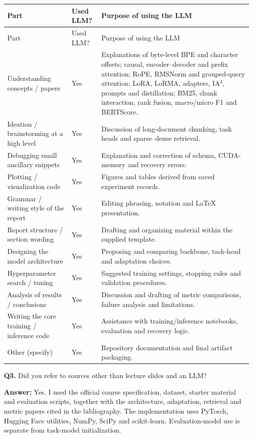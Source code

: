 {\small
\setlength{\tabcolsep}{5pt}
\renewcommand{\arraystretch}{1.12}
\begin{longtable}{>{\raggedright\arraybackslash}p{3.9cm}>{\centering\arraybackslash}p{1.25cm}>{\raggedright\arraybackslash}p{9.7cm}}
\toprule
Part & Used LLM? & Purpose of using the LLM\\
\midrule
\endfirsthead
\toprule
Part & Used LLM? & Purpose of using the LLM\\
\midrule
\endhead
\bottomrule
\endfoot
Understanding concepts / papers & Yes & Explanations of byte-level BPE and character offsets; causal, encoder--decoder and prefix attention; RoPE, RMSNorm and grouped-query attention; LoRA, LoRMA, adapters, IA$^3$, prompts and distillation; BM25, chunk interaction, rank fusion, macro/micro F1 and BERTScore.\\
Ideation / brainstorming at a high level & Yes & Discussion of long-document chunking, task heads and sparse--dense retrieval.\\
Debugging small ancillary snippets & Yes & Explanation and correction of schema, CUDA-memory and recovery errors.\\
Plotting / visualization code & Yes & Figures and tables derived from saved experiment records.\\
Grammar / writing style of the report & Yes & Editing phrasing, notation and LaTeX presentation.\\
Report structure / section wording & Yes & Drafting and organizing material within the supplied template.\\
Designing the model architecture & Yes & Proposing and comparing backbone, task-head and adaptation choices.\\
Hyperparameter search / tuning & Yes & Suggested training settings, stopping rules and validation procedures.\\
Analysis of results / conclusions & Yes & Discussion and drafting of metric comparisons, failure analysis and limitations.\\
Writing the core training / inference code & Yes & Assistance with training/inference notebooks, evaluation and recovery logic.\\
Other (specify) & Yes & Repository documentation and final artifact packaging.\\
\end{longtable}
}

\noindent\textbf{Q3.} Did you refer to sources other than lecture slides and an LLM?

\noindent\textbf{Answer:} Yes. I used the official course specification, dataset, starter material and evaluation scripts, together with the architecture, adaptation, retrieval and metric papers cited in the bibliography. The implementation uses PyTorch, Hugging Face utilities, NumPy, SciPy and scikit-learn. Evaluation-model use is separate from task-model initialization.

